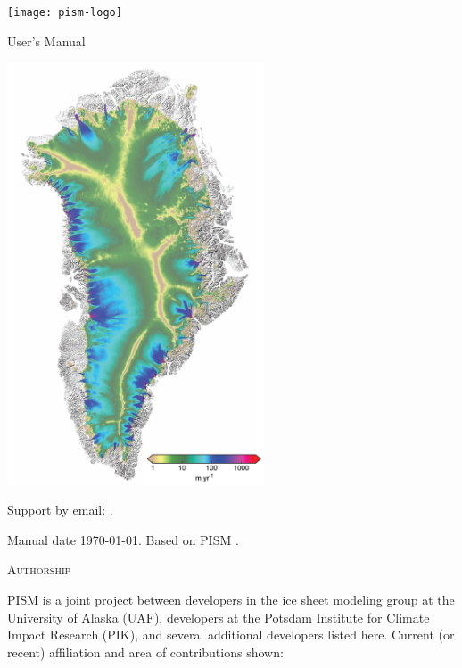 \documentclass[titlepage,letterpaper,final]{scrartcl}
\begin{document}
\graphicspath{{figs/}}

\begin{titlepage}

  \begin{center}

    \texttt{[image: pism-logo]}

    \vspace{2.0cm}
    {\Huge {} User's Manual}
    \vspace{2.0cm}

    \includegraphics[width=3.0in,keepaspectratio=true]{gris-flow-600m}

    \vfill

    \small Support by email: \PISMEMAIL.
    \medskip

    Manual date \today. Based on PISM \PISMREV.
    \medskip

    \PISMDOWNLOADMSG
  \end{center}
\end{titlepage}

\newpage
\phantom{bob}

\centerline{\textsc{Authorship}}
\bigskip

\normalspacing
PISM is a joint project between developers in the ice sheet modeling group at the University of Alaska (UAF), developers at the Potsdam Institute for Climate Impact Research (PIK), and several additional developers listed here.  Current (or recent) affiliation and area of contributions shown:
\bigskip
\normalspacing
\end{document}
